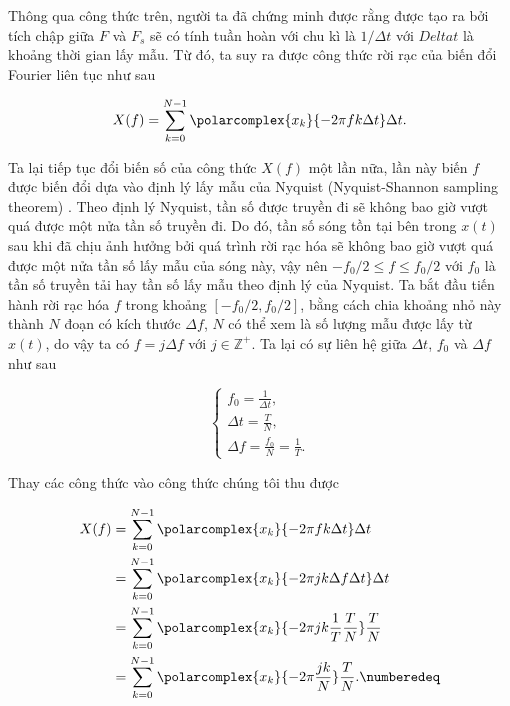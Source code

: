 			Thông qua công thức trên, người ta \cite{fft_brigham} đã chứng minh được rằng \spectrum{} được tạo ra bởi tích chập giữa $F$ và $F_s$ sẽ có tính tuần hoàn với chu kì là $1/\Delta t$ với $Delta t$ là khoảng thời gian lấy mẫu. Từ đó, ta suy ra được công thức rời rạc của biến đổi Fourier liên tục như sau
			
				\begin{equation}
					X(f) = \sum_{k=0}^{N - 1} \polarcomplex{x_k}{-2\pi f k \Delta t} \Delta t.
				\label{dct::var_freq_formula_discrete}
				\end{equation}
			
			Ta lại tiếp tục đổi biến số của công thức $X(f)$ một lần nữa, lần này biến $f$ được biến đổi dựa vào định lý lấy mẫu của Nyquist (Nyquist-Shannon sampling theorem) \cite{mdft}. Theo định lý Nyquist, tần số được truyền đi sẽ không bao giờ vượt quá được một nửa tần số truyền đi. Do đó, tần số sóng tồn tại bên trong $x(t)$ sau khi đã chịu ảnh hưởng bởi quá trình rời rạc hóa sẽ không bao giờ vượt quá được một nửa tần số lấy mẫu của sóng này, vậy nên $-f_0 / 2 \le f \le f_0 / 2$ với $f_0$ là tần số truyền tải hay tần số lấy mẫu theo định lý của Nyquist. Ta bắt đầu tiến hành rời rạc hóa $f$ trong khoảng $[-f_0 / 2, f_0 / 2]$, bằng cách chia khoảng nhỏ này thành $N$ đoạn có kích thước $\Delta f$, $N$ có thể xem là số lượng mẫu được lấy từ $x(t)$, do vậy ta có $f = j\Delta f$ với $j \in \mathbb{Z}^+$. Ta lại có sự liên hệ giữa $\Delta t$, $f_0$ và $\Delta f$ như sau
			
				\begin{equation}
					\begin{cases}
						f_0 = \frac{1}{\Delta t}, \\
						\Delta t = \frac{T}{N}, \\
						\Delta f = \frac{f_0}{N} = \frac{1}{T}.
					\end{cases}
				\label{dct::relation_formulas}
				\end{equation}
			
			Thay các công thức  vào công thức  chúng tôi thu được
			
				\begin{align*}
					X(f)	& = \sum_{k=0}^{N - 1} \polarcomplex{x_k}{-2\pi f k \Delta t} \Delta t \\
							& = \sum_{k=0}^{N - 1} \polarcomplex{x_k}{-2\pi j k \Delta f \Delta t} \Delta t \\
							& = \sum_{k=0}^{N - 1} \polarcomplex{x_k}{-2\pi j k \frac{1}{T} \frac{T}{N}} \frac{T}{N} \\
							& = \sum_{k=0}^{N - 1} \polarcomplex{x_k}{-2\pi \frac{j k}{N}} \frac{T}{N}. \numberedeq
				\end{align*}
			
